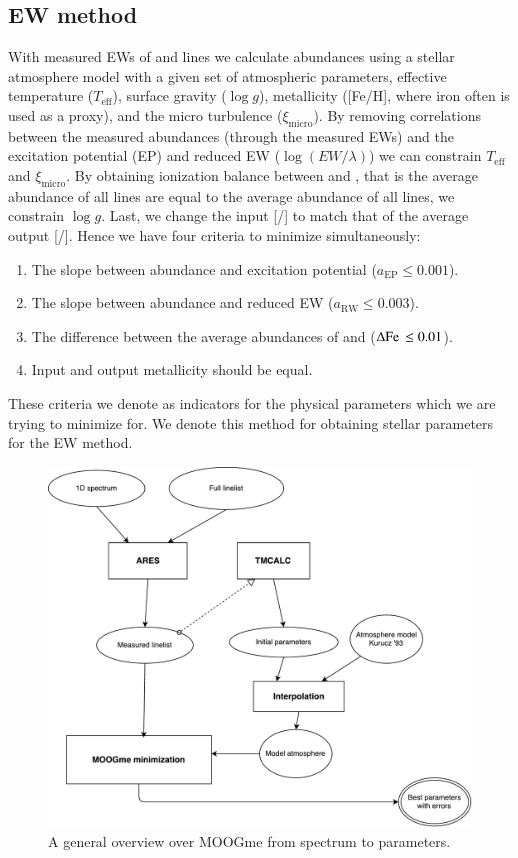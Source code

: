 \documentclass{aa}
\begin{document}
\subsection{EW method}
\label{sub:EW_method}
With measured EWs of  and  lines we calculate abundances using a
stellar atmosphere model with a given set of atmospheric parameters,
effective temperature ($T_\mathrm{eff}$), surface gravity ($\log g$),
metallicity ([Fe/H], where iron often is used as a proxy), and the micro
turbulence ($\xi_\mathrm{micro}$). By removing correlations between the measured
abundances (through the measured EWs) and the excitation potential (EP) and reduced
EW ($\log(EW/\lambda)$) we can constrain $T_\mathrm{eff}$ and $\xi_\mathrm{micro}$. By
obtaining ionization balance between  and , that is
the average abundance of all  lines are equal to the average
abundance of all  lines, we constrain $\log g$. Last, we change
the input [/] to match that of the average output
[/]. Hence we have four criteria to minimize simultaneously:

\begin{enumerate}
    \item The slope between abundance and excitation potential ($a_\mathrm{EP}\le0.001$).
    \item The slope between abundance and reduced EW ($a_\mathrm{RW}\le0.003$).
    \item The difference between the average abundances of  and
           ($\Delta\ion{Fe}{}\le0.01$).
    \item Input and output metallicity should be equal.
\end{enumerate}
These criteria we denote as indicators for the physical parameters which
we are trying to minimize for. We denote this method for obtaining stellar
parameters for the EW method.

\begin{figure}[tpb]
    \centering
    \includegraphics[width=1.0\linewidth]{figures/MOOGme_general.pdf}
    \caption{A general overview over MOOGme from spectrum to parameters.}
    \label{fig:MOOGme_general}
\end{figure}
\end{document}
